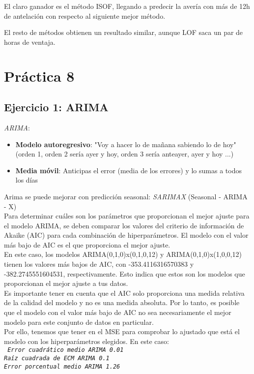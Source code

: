 \documentclass[
12pt, 
spanish, 
singlespacing,
headsepline
]{article}
\newcommand{\code}[1]{\textit{\texttt{#1}}}
\begin{document}
El claro ganador es el método ISOF, llegando a predecir la avería con más de 12h de antelación con respecto al siguiente mejor método.

El resto de métodos obtienen un resultado similar, aunque LOF saca un par de horas de ventaja.

\section{Práctica 8}
\subsection{Ejercicio 1: ARIMA}
\emph{ARIMA}:
\begin{itemize}
\item \textbf{Modelo autoregresivo}: "Voy a hacer lo de mañana sabiendo lo de hoy" (orden 1, orden 2 sería ayer y hoy, orden 3 sería anteayer, ayer y hoy ...)
\item \textbf{Media móvil}: Anticipas el error (media de los errores) y lo sumas a todos los días
\end{itemize}

Arima se puede mejorar con predicción seasonal: \emph{SARIMAX} (Seasonal - ARIMA - X)
\\

Para determinar cuáles son los parámetros que proporcionan el mejor ajuste para el modelo ARIMA, se deben comparar los valores del criterio de información de Akaike (AIC) para cada combinación de hiperparámetros. El modelo con el valor más bajo de AIC es el que proporciona el mejor ajuste.
\\

En este caso, los modelos ARIMA(0,1,0)x(0,1,0,12) y ARIMA(0,1,0)x(1,0,0,12) tienen los valores más bajos de AIC, con -353.4116316570383 y -382.2745551604531, respectivamente. Esto indica que estos son los modelos que proporcionan el mejor ajuste a tus datos.
\\

Es importante tener en cuenta que el AIC solo proporciona una medida relativa de la calidad del modelo y no es una medida absoluta. Por lo tanto, es posible que el modelo con el valor más bajo de AIC no sea necesariamente el mejor modelo para este conjunto de datos en particular.
\\

Por ello, tenemos que tener en  el MSE para comprobar lo ajustado que está el modelo con los hiperparámetros elegidos. En este caso:\\
\code{
Error cuadrático medio ARIMA 0.01\\
Raíz cuadrada de ECM ARIMA 0.1\\
Error porcentual medio ARIMA 1.26\\
}
\end{document}

